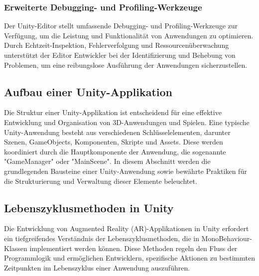 \subsubsection{Erweiterte Debugging- und Profiling-Werkzeuge}
Der Unity-Editor stellt umfassende Debugging- und Profiling-Werkzeuge zur Verfügung, um die Leistung und Funktionalität
von Anwendungen zu optimieren. Durch Echtzeit-Inspektion, Fehlerverfolgung und Ressourcenüberwachung unterstützt der
Editor Entwickler bei der Identifizierung und Behebung von Problemen, um eine reibungslose Ausführung der Anwendungen
sicherzustellen.

\subsection{Aufbau einer Unity-Applikation}
Die Struktur einer Unity-Applikation ist entscheidend für eine effektive Entwicklung und Organisation von 3D-Anwendungen
und Spielen. Eine typische Unity-Anwendung besteht aus verschiedenen Schlüsselelementen, darunter Szenen, GameObjects,
Komponenten, Skripte und Assets. Diese werden koordiniert durch die Hauptkomponente der Anwendung, die sogenannte
"GameManager" oder "MainScene". In diesem Abschnitt werden die grundlegenden Bausteine einer Unity-Anwendung sowie
bewährte Praktiken für die Strukturierung und Verwaltung dieser Elemente beleuchtet.

\subsection{Lebenszyklusmethoden in Unity}
Die Entwicklung von Augmented Reality (AR)-Applikationen in Unity erfordert ein tiefgreifendes Verständnis der
Lebenszyklusmethoden, die in MonoBehaviour-Klassen implementiert werden können. Diese Methoden regeln den Fluss der
Programmlogik und ermöglichen Entwicklern, spezifische Aktionen zu bestimmten Zeitpunkten im Lebenszyklus einer
Anwendung auszuführen.

